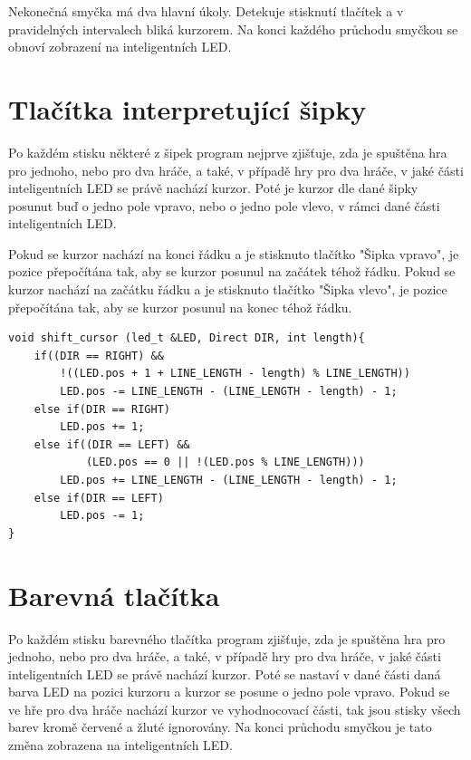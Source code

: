 Nekonečná smyčka má dva hlavní úkoly. Detekuje stisknutí tlačítek a v pravidelných intervalech bliká kurzorem. Na konci každého průchodu smyčkou 
se obnoví zobrazení na inteligentních LED.

\section{Tlačítka interpretující šipky}
Po každém stisku některé z šipek program nejprve zjišťuje, zda je spuštěna hra pro jednoho, nebo pro dva hráče, a také, v případě hry pro dva
hráče, v jaké části inteligentních LED se právě nachází kurzor. Poté je kurzor dle dané šipky posunut buď o jedno pole vpravo, nebo o jedno 
pole vlevo, v rámci dané části inteligentních LED. 

Pokud se kurzor nachází na konci řádku a je stisknuto tlačítko "Šipka vpravo", je pozice přepočítána tak, aby se kurzor posunul na 
začátek téhož řádku. Pokud se kurzor nachází na začátku řádku a je stisknuto tlačítko "Šipka vlevo", je pozice přepočítána tak, aby se kurzor 
posunul na konec téhož řádku. 

\begin{minipage}{\linewidth}
\begin{lstlisting}[frame=single,numbers=right,caption={Funkce posouvající kurzor.},label=lst:priklad.vypis.kodu.C,basicstyle=\ttfamily\small, keywordstyle=\color{black}\bfseries\underbar,]
void shift_cursor (led_t &LED, Direct DIR, int length){
    if((DIR == RIGHT) && 
        !((LED.pos + 1 + LINE_LENGTH - length) % LINE_LENGTH))
        LED.pos -= LINE_LENGTH - (LINE_LENGTH - length) - 1;
    else if(DIR == RIGHT)
        LED.pos += 1;
    else if((DIR == LEFT) && 
            (LED.pos == 0 || !(LED.pos % LINE_LENGTH)))
        LED.pos += LINE_LENGTH - (LINE_LENGTH - length) - 1;
    else if(DIR == LEFT)
        LED.pos -= 1;
}   
\end{lstlisting}
\end{minipage} 
    
\section{Barevná tlačítka}
Po každém stisku barevného tlačítka program zjišťuje, zda je spuštěna hra pro jednoho, nebo pro dva hráče, a také, v případě hry pro dva hráče,
v jaké části inteligentních LED se právě nachází kurzor. Poté se nastaví v dané části daná barva LED na pozici kurzoru a kurzor se posune o 
jedno pole vpravo. Pokud se ve hře pro dva hráče nachází kurzor ve vyhodnocovací části, tak jsou stisky všech barev kromě červené a žluté 
ignorovány. Na konci průchodu smyčkou je tato změna zobrazena na inteligentních LED. 

